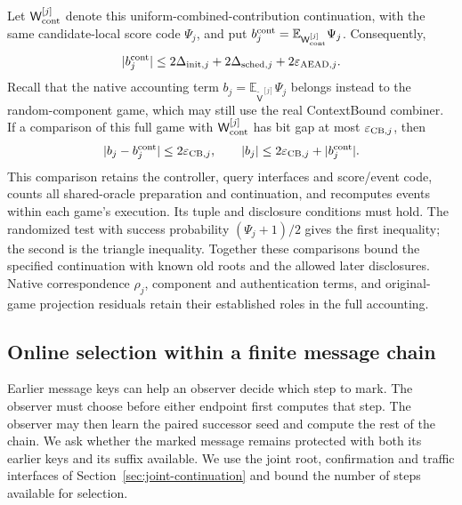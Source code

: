 \documentclass[pdflatex]{sn-jnl}
\theoremstyle{thmstyleone}
\theoremstyle{thmstylethree}
\theoremstyle{thmstyletwo}
\begin{document}
Let $\mathsf W_{\rm cont}^{[j]}$ denote this uniform-combined-contribution
continuation, with the same candidate-local score code $\Psi_j$, and put
$b_j^{\rm cont}=\mathbb E_{\mathsf W_{\rm cont}^{[j]}}\Psi_j$.
Consequently,
\[
 |b_j^{\rm cont}|\le
 2\Delta_{{\rm init},j}
 +2\Delta_{{\rm sched},j}
 +2\varepsilon_{{\rm AEAD},j}.
\]
Recall that the native accounting term
$b_j=\mathbb E_{\widetilde{\mathsf V}^{[j]}}\Psi_j$ belongs instead to
the random-component game, which may still use the real ContextBound
combiner. If a comparison of this full game with
$\mathsf W_{\rm cont}^{[j]}$ has bit gap at most
$\varepsilon_{{\rm CB},j}$, then
\[
 |b_j-b_j^{\rm cont}|\le2\varepsilon_{{\rm CB},j},
 \qquad
 |b_j|\le2\varepsilon_{{\rm CB},j}+|b_j^{\rm cont}|.
\]
This comparison retains the controller, query interfaces and score/event
code, counts all shared-oracle preparation and continuation, and recomputes
events within each game's execution. Its tuple and disclosure conditions
must hold. The randomized test with success probability
$(\Psi_j+1)/2$ gives the first inequality; the second is the triangle
inequality. Together these comparisons bound the specified continuation
with known old roots and the allowed later disclosures. Native
correspondence $\rho_j$, component and authentication terms, and
original-game projection residuals retain their established roles in
the full accounting.
\subsection{Online selection within a finite message chain}
\label{sec:chain-prefix}

Earlier message keys can help an observer decide which step to mark.
The observer must choose before either endpoint first computes that step.
The observer may then learn the paired successor seed and compute the
rest of the chain. We ask whether the marked message remains protected
with both its earlier keys and its suffix available. We use the joint
root, confirmation and traffic interfaces of
Section~\ref{sec:joint-continuation} and bound the number of steps
available for selection.
\end{document}
